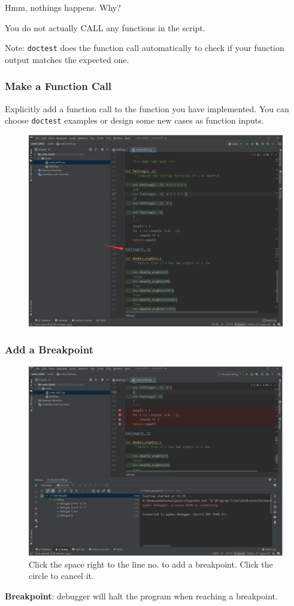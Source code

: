 \documentclass[aspectratio=169]{beamer}
\begin{document}
\begin{frame}
\vspace{20mm}
\begin{center}
Hmm, nothings happens. Why?

You do not actually CALL any functions in the script.
\end{center}
\vspace{25mm}
Note: \texttt{doctest} does the function call automatically to check if your function output matches the expected one.
\end{frame}

\begin{frame}
\frametitle{Make a Function Call}
Explicitly add a function call to the function you have implemented. You can choose \texttt{doctest} examples or design some new cases as function inputs.
\begin{figure}
    \centering
    \includegraphics[width=0.5\linewidth]{./imgs/add_func_call.png}
    \label{fig:add_func_call}
\end{figure}
\end{frame}


\begin{frame}
\frametitle{Add a Breakpoint}
\begin{figure}
    \centering
    \includegraphics[width=0.45\linewidth]{./imgs/breakpoint.png}
    \caption{Click the space right to the line no. to add a breakpoint. Click the circle to cancel it.}
    \label{fig:breakpoint}
\end{figure}
\vspace{-5mm}
\small{\textbf{Breakpoint}: debugger will halt the program when reaching a breakpoint.}
\end{frame}
\end{document}
